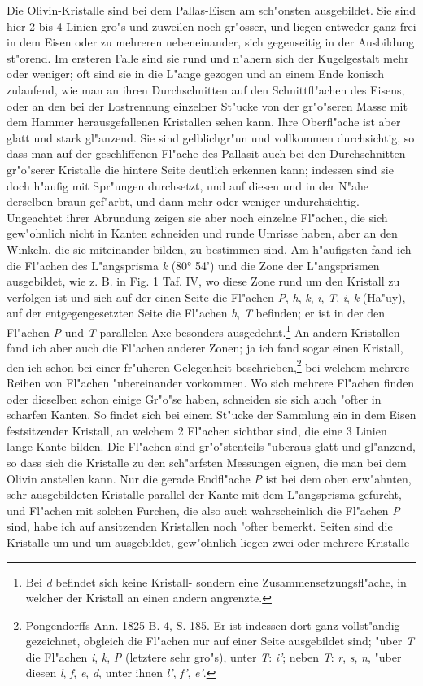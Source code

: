 \documentclass[a4paper, 11pt, oneside, german]{article}
\begin{document}
Die Olivin-Kristalle sind bei dem Pallas-Eisen am sch"onsten ausgebildet. Sie sind hier 2 bis 4 Linien gro"s und zuweilen noch gr"osser, und liegen entweder ganz frei in dem Eisen oder zu mehreren nebeneinander, sich gegenseitig in der Ausbildung st"orend. Im ersteren Falle sind sie rund und n"ahern sich der Kugelgestalt mehr oder weniger; oft sind sie in die L"ange gezogen und an einem Ende konisch zulaufend, wie man an ihren Durchschnitten auf den Schnittfl"achen des Eisens, oder an den bei der Lostrennung einzelner St"ucke von der gr"o"seren Masse mit dem Hammer herausgefallenen Kristallen sehen kann. Ihre Oberfl"ache ist aber glatt und stark gl"anzend. Sie sind gelblichgr"un und vollkommen durchsichtig, so dass man auf der geschliffenen Fl"ache des Pallasit auch bei den Durchschnitten gr"o"serer Kristalle die hintere Seite deutlich erkennen kann; indessen sind sie doch h"aufig mit Spr"ungen durchsetzt, und auf diesen und in der N"ahe derselben braun gef"arbt, und dann mehr oder weniger undurchsichtig. Ungeachtet ihrer Abrundung zeigen sie aber noch einzelne Fl"achen, die sich gew"ohnlich nicht in Kanten schneiden und runde Umrisse haben, aber an den Winkeln, die sie miteinander bilden, zu bestimmen sind. Am h"aufigsten fand ich die Fl"achen des L"angsprisma \emph{k} (80° 54’) und die Zone der L"angsprismen ausgebildet, wie z. B. in Fig. 1 Taf. IV, wo diese Zone rund um den Kristall zu verfolgen ist und sich auf der einen Seite die Fl"achen \emph{P}, \emph{h}, \emph{k}, \emph{i}, \emph{T}, \emph{i}, \emph{k} (Ha"uy), auf der entgegengesetzten Seite die Fl"achen \emph{h}, \emph{T} befinden; er ist in der den Fl"achen \emph{P} und \emph{T} parallelen Axe besonders ausgedehnt.\footnote{Bei \emph{d} befindet sich keine Kristall- sondern eine Zusammensetzungsfl"ache, in welcher der Kristall an einen andern angrenzte.} An andern Kristallen fand ich aber auch die Fl"achen anderer Zonen; ja ich fand sogar einen Kristall, den ich schon bei einer fr"uheren Gelegenheit beschrieben,\footnote{Pongendorffs Ann. 1825 B. 4, S. 185. Er ist indessen dort ganz vollst"andig gezeichnet, obgleich die Fl"achen nur auf einer Seite ausgebildet sind; "uber \emph{T} die Fl"achen \emph{i}, \emph{k}, \emph{P} (letztere sehr gro"s), unter \emph{T}: \emph{i'}; neben \emph{T}: \emph{r}, \emph{s}, \emph{n}, "uber diesen \emph{l}, \emph{f}, \emph{e}, \emph{d}, unter ihnen \emph{l'}, \emph{f'}, \emph{e'}.} bei welchem mehrere Reihen von Fl"achen "ubereinander vorkommen. Wo sich mehrere Fl"achen finden oder dieselben schon einige Gr"o"se haben, schneiden sie sich auch "ofter in scharfen Kanten. So findet sich bei einem St"ucke der Sammlung ein in dem Eisen festsitzender Kristall, an welchem 2 Fl"achen sichtbar sind, die eine 3 Linien lange Kante bilden. Die Fl"achen sind gr"o"stenteils "uberaus glatt und gl"anzend, so dass sich die Kristalle zu den sch"arfsten Messungen eignen, die man bei dem Olivin anstellen kann. Nur die gerade Endfl"ache \emph{P} ist bei dem oben erw"ahnten, sehr ausgebildeten Kristalle parallel der Kante mit dem L"angsprisma gefurcht, und Fl"achen mit solchen Furchen, die also auch wahrscheinlich die Fl"achen \emph{P} sind, habe ich auf ansitzenden Kristallen noch "ofter bemerkt. Seiten sind die Kristalle um und um ausgebildet, gew"ohnlich liegen zwei oder mehrere Kristalle 
\end{document}
